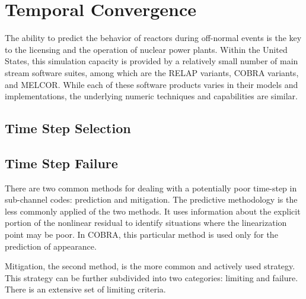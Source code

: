 \section{Temporal Convergence}
\label{sect:temporal_convergence}
The ability to predict the behavior of reactors during off-normal events is the key to the licensing and the operation of nuclear power plants.
Within the United States, this simulation capacity is provided by a relatively small number of main stream software suites, among which are the RELAP variants, COBRA variants, and MELCOR.
While each of these software products varies in their models and implementations, the underlying numeric techniques and capabilities are similar.

\subsection{Time Step Selection}
\label{subsect:time_step_selection}

\subsection{Time Step Failure}
\label{subsect:time_step_failure}
There are two common methods for dealing with a potentially poor time-step in sub-channel codes: prediction and mitigation.
The predictive methodology is the less commonly applied of the two methods.
It uses information about the explicit portion of the nonlinear residual to identify situations where the linearization point may be poor.
In COBRA, this particular method is used only for the prediction of \ncg appearance.

Mitigation, the second method, is the more common and actively used strategy.
This strategy can be further subdivided into two categories: limiting and failure.
There is an extensive set of limiting criteria.
